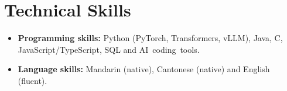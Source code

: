 \documentclass[10pt]{article}
\begin{document}
\section{Technical Skills}
\begin{itemize}
  \item \textbf{Programming skills:} Python (PyTorch, Transformers, vLLM), Java, C, JavaScript/TypeScript, SQL and \mbox{AI coding tools}.
  \item \textbf{Language skills:} Mandarin (native), Cantonese (native) and English (fluent).
\end{itemize}
\end{document}
